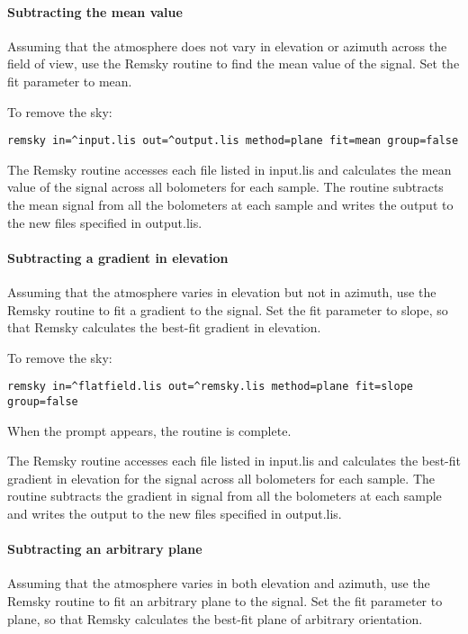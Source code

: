\documentclass[twoside,11pt]{article}
\renewcommand{\_}{\texttt{\symbol{95}}}
\begin{document}
\paragraph{Subtracting the mean value}

Assuming that the atmosphere does not vary in elevation or azimuth
across the field of view, use the Remsky routine to find the mean
value of the signal. Set the fit parameter to mean.

To remove the sky:
\begin{verbatim}
remsky in=^input.lis out=^output.lis method=plane fit=mean group=false
\end{verbatim}

The Remsky routine accesses each file listed in input.lis and
calculates the mean value of the signal across all bolometers for each
sample. The routine subtracts the mean signal from all the bolometers
at each sample and writes the output to the new files specified in
output.lis.

\paragraph{Subtracting a gradient in elevation}

Assuming that the atmosphere varies in elevation but not in azimuth,
use the Remsky routine to fit a gradient to the signal. Set the fit
parameter to slope, so that Remsky calculates the best-fit gradient in
elevation.

To remove the sky:
\begin{verbatim}
remsky in=^flatfield.lis out=^remsky.lis method=plane fit=slope group=false
\end{verbatim}
When the prompt appears, the routine is complete.

The Remsky routine accesses each file listed in input.lis and
calculates the best-fit gradient in elevation for the signal across
all bolometers for each sample.  The routine subtracts the gradient in
signal from all the bolometers at each sample and writes the output to
the new files specified in output.lis.

\paragraph{Subtracting an arbitrary plane}

Assuming that the atmosphere varies in both elevation and azimuth, use
the Remsky routine to fit an arbitrary plane to the signal. Set the
fit parameter to plane, so that Remsky calculates the best-fit plane
of arbitrary orientation.
\end{document}
